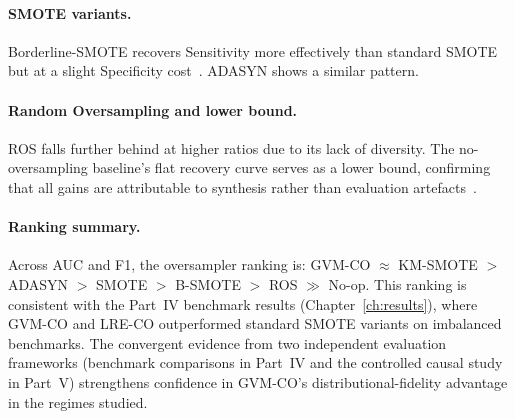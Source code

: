 \paragraph{SMOTE variants.}
Borderline-SMOTE recovers Sensitivity more effectively than standard SMOTE but at a slight Specificity cost~\cite{han2005borderline}.
ADASYN shows a similar pattern.

\paragraph{Random Oversampling and lower bound.}
ROS falls further behind at higher ratios due to its lack of diversity.
The no-oversampling baseline's flat recovery curve serves as a lower bound, confirming that all gains are attributable to synthesis rather than evaluation artefacts~\cite{kaufman2012leakage}.

\paragraph{Ranking summary.}
Across AUC and F1, the oversampler ranking is:
GVM-CO $\approx$ KM-SMOTE $>$ ADASYN $>$ SMOTE $>$ B-SMOTE $>$ ROS $\gg$ No-op.
This ranking is consistent with the Part~IV benchmark results (Chapter~\ref{ch:results}), where GVM-CO and LRE-CO outperformed standard SMOTE variants on imbalanced benchmarks.
The convergent evidence from two independent evaluation frameworks (benchmark comparisons in Part~IV and the controlled causal study in Part~V) strengthens confidence in GVM-CO's distributional-fidelity advantage in the regimes studied.
